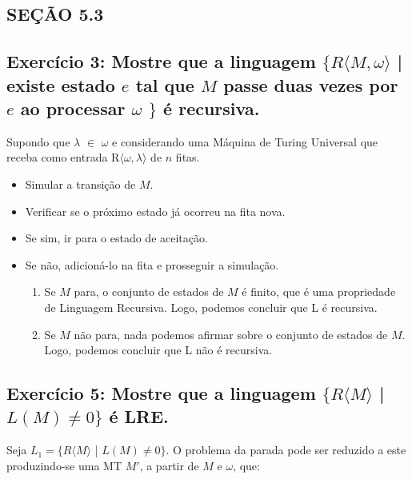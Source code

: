 
\subsection*{SEÇÃO 5.3}
\subsection*{Exercício 3: Mostre que a linguagem $\{R\langle M,\omega\rangle$ | existe estado $e$ tal que $M$ passe duas vezes por $e$ ao processar $\omega$ $\}$  é recursiva.}

Supondo que $\lambda$ $\in$ $\omega$ e considerando uma Máquina de Turing Universal que receba como entrada R$\langle \omega,\lambda \rangle$ de $n$ fitas.

\begin{itemize}
   \item Simular a transição de $M$.
   \item Verificar se o próximo estado já ocorreu na fita nova.
   \item Se sim, ir para o estado de aceitação.
   \item Se não, adicioná-lo na fita e prosseguir a simulação.
   
   \begin{enumerate}
       \item Se $M$ para, o conjunto de estados de $M$ é finito, que é uma propriedade de Linguagem Recursiva. Logo, podemos concluir que L é recursiva.
       \item Se $M$ não para, nada podemos afirmar sobre o conjunto de estados de $M$. Logo, podemos concluir que L não é recursiva.
 \end{enumerate}
   
 \end{itemize}
 

\subsection*{Exercício 5: Mostre que a linguagem $\{R\langle M \rangle$ | $L(M) \neq 0 \}$ é LRE.}

Seja $L_1 = \{R\langle M \rangle$ | $L(M) \neq 0 \}$. O problema da parada pode ser reduzido a este produzindo-se uma MT $M'$, a partir de $M$ e $\omega$, que:


